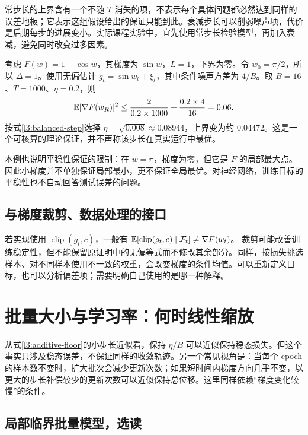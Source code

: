 常步长的上界含有一个不随 $T$ 消失的项，不表示每个具体问题都必然达到同样的误差地板；它表示这组假设给出的保证只能到此。衰减步长可以削弱噪声项，代价是后期每步的进展变小。实际课程实验中，宜先使用常步长检验模型，再加入衰减，避免同时改变过多因素。

\begin{example}[计算一个非凸梯度界]
考虑 $F(w)=1-\cos w$，其梯度为 $\sin w$，$L=1$，下界为零。令 $w_0=\pi/2$，所以 $\Delta=1$。使用无偏估计
$g_t=\sin w_t+\xi_t$，其中条件噪声方差为 $4/B$。取 $B=16$、$T=1000$、$\eta=0.2$，则
\[
 \mathbb E|\nabla F(w_R)|^2\leq
 \frac{2}{0.2\times1000}+\frac{0.2\times4}{16}=0.06.
\]
按式\eqref{l3:balanced-step}选择 $\eta=\sqrt{0.008}\approx0.08944$，上界变为约 $0.04472$。这是一个可核算的理论保证，并不声称该步长在真实运行中最优。

本例也说明平稳性保证的限制：在 $w=\pi$，梯度为零，但它是 $F$ 的局部最大点。因此小梯度并不单独保证局部最小，更不保证全局最优。对神经网络，训练目标的平稳性也不自动回答测试误差的问题。
\end{example}

\subsection{与梯度裁剪、数据处理的接口}

若实现使用 $\operatorname{clip}(g_t,c)$，一般有
$\mathbb E[\operatorname{clip}(g_t,c)\mid\mathcal F_t]\ne\nabla F(w_t)$。
裁剪可能改善训练稳定性，但不能保留原证明中的无偏等式而不修改其余部分。同样，按损失挑选样本、对不同样本使用不一致的权重，会改变梯度的条件均值。可以重新定义目标，也可以分析偏差项；需要明确自己使用的是哪一种解释。

\section{批量大小与学习率：何时线性缩放}
\label{l3:batch-scaling}

从式\eqref{l3:additive-floor}的小步长近似看，保持 $\eta/B$ 可以近似保持稳态损失。但这个事实只涉及稳态误差，不保证同样的收敛轨迹。另一个常见视角是：当每个 epoch 的样本数不变时，扩大批次会减少更新次数；如果短时间内梯度方向几乎不变，以更大的步长补偿较少的更新次数可以近似保持总位移。这里同样依赖“梯度变化较慢”的条件。

\subsection{局部临界批量模型，选读}

